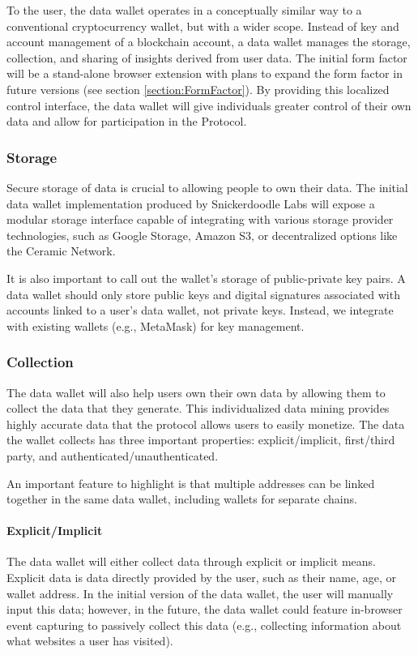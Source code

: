 To the user, the data wallet operates in a conceptually similar way to a conventional cryptocurrency wallet, but with a wider scope. 
Instead of key and account management of a blockchain account, a data wallet manages the storage, collection, and sharing of insights derived 
from user data. The initial form factor will be a stand-alone browser extension with plans to expand the form factor in future versions (see 
section \ref{section:FormFactor}). By providing this localized control interface, the data wallet will give individuals greater control 
of their own data and allow for participation in the Protocol.

\subsubsection{Storage}

Secure storage of data is crucial to allowing people to own their data. The initial data wallet implementation produced by 
Snickerdoodle Labs will expose a modular storage interface capable of integrating with various storage provider technologies, 
such as Google Storage, Amazon S3, or decentralized options like the Ceramic Network.

It is also important to call out the wallet's storage of public-private key pairs. A data wallet should only store public keys 
and digital signatures associated with accounts linked to a user's data wallet, not private keys. 
Instead, we integrate with existing wallets (e.g., MetaMask) for key management.


\subsubsection{Collection}
The data wallet will also help users own their own data by allowing them to collect the data that they generate. This individualized data mining 
provides highly accurate data that the protocol allows users to easily monetize. The data the wallet collects has three important properties: 
explicit/implicit, first/third party, and authenticated/unauthenticated. %

An important feature to highlight is that multiple addresses can be linked together in the same data wallet, including wallets for separate chains. 

\paragraph{Explicit/Implicit}
The data wallet will either collect data through explicit or implicit means. Explicit data is data directly provided by the user, such as their name, 
age, or wallet address. In the initial version of the data wallet, the user will manually input this data; however, in the future, the data wallet 
could feature in-browser event capturing to passively collect this data (e.g., collecting information about what websites a user has visited).


